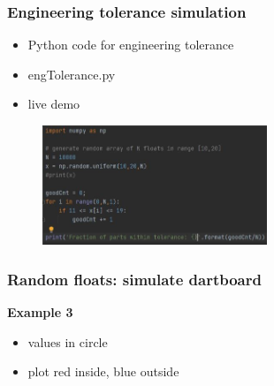 \documentclass[english,14pt]{beamer}
\begin{document}
\begin{frame}[fragile]

\frametitle{Engineering tolerance simulation}

\begin{itemize}
	\item Python code for engineering tolerance
	\item engTolerance.py
	\item live demo
\end{itemize}

\begin{figure}[ht]
	\centering
	\includegraphics[width=0.6\textwidth]{figures/engTolerance}
\end{figure}

\end{frame}


\begin{frame}[fragile]

\frametitle{Random floats: simulate dartboard}

\textbf{Example 3}\\
\vspace*{5mm}
\begin{itemize}
	\item values in circle
	\item plot red inside, blue outside
\end{itemize}

\end{frame}

\end{document}
